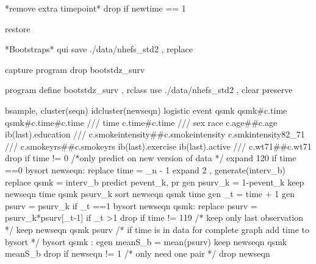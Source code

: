 \documentclass[
  10pt,
  a4paper,
]{book}
\newenvironment{Shaded}{\begin{snugshade}}{\end{snugshade}}
\newcommand{\CommentTok}[1]{\textcolor[rgb]{0.37,0.37,0.37}{#1}}
\newcommand{\DataTypeTok}[1]{\textcolor[rgb]{0.68,0.00,0.00}{#1}}
\newcommand{\FunctionTok}[1]{\textcolor[rgb]{0.28,0.35,0.67}{#1}}
\newcommand{\KeywordTok}[1]{\textcolor[rgb]{0.00,0.46,0.62}{#1}}
\newcommand{\NormalTok}[1]{\textcolor[rgb]{0.00,0.46,0.62}{#1}}
\begin{document}
\begin{Shaded}
\begin{Highlighting}[]
\NormalTok{*remove extra timepoint*}
\KeywordTok{drop} \KeywordTok{if}\NormalTok{ newtime == 1}

\KeywordTok{restore}

\NormalTok{*Bootstraps*}
\KeywordTok{qui} \KeywordTok{save}\NormalTok{ ./}\KeywordTok{data}\NormalTok{/nhefs\_std2 , }\KeywordTok{replace}
 
\KeywordTok{capture} \KeywordTok{program} \KeywordTok{drop}\NormalTok{ bootstdz\_surv}

\KeywordTok{program} \KeywordTok{define}\NormalTok{ bootstdz\_surv , rclass}
\KeywordTok{use}\NormalTok{ ./}\KeywordTok{data}\NormalTok{/nhefs\_std2 , }\KeywordTok{clear}
\KeywordTok{preserve}

\KeywordTok{bsample}\NormalTok{, }\KeywordTok{cluster}\NormalTok{(seqn) idcluster(newseqn)       }
\KeywordTok{logistic}\NormalTok{ event qsmk qsmk\#c.time qsmk\#c.time\#c.time }\CommentTok{///}
\NormalTok{  time c.time\#c.time }\CommentTok{///}
\NormalTok{    sex race c.age\#\#c.age ib(}\FunctionTok{last}\NormalTok{).education }\CommentTok{///}
\NormalTok{    c.smokeintensity\#\#c.smokeintensity c.smkintensity82\_71 }\CommentTok{///}
\NormalTok{    c.smokeyrs\#\#c.smokeyrs ib(}\FunctionTok{last}\NormalTok{).exercise ib(}\FunctionTok{last}\NormalTok{).active }\CommentTok{///}
\NormalTok{    c.wt71\#\#c.wt71 }
\KeywordTok{drop} \KeywordTok{if}\NormalTok{ time != 0   }
\CommentTok{/*only predict on new version of data */}
\NormalTok{expand 120 }\KeywordTok{if}\NormalTok{ time ==0 }
\KeywordTok{bysort}\NormalTok{ newseqn: }\KeywordTok{replace}\NormalTok{ time = }\DataTypeTok{\_n}\NormalTok{ {-} 1               }
\NormalTok{expand 2 , }\KeywordTok{generate}\NormalTok{(interv\_b) }
\KeywordTok{replace}\NormalTok{ qsmk = interv\_b          }
\KeywordTok{predict}\NormalTok{ pevent\_k, pr}
\KeywordTok{gen}\NormalTok{ psurv\_k = 1{-}pevent\_k}
\KeywordTok{keep}\NormalTok{ newseqn  time qsmk psurv\_k                 }
\KeywordTok{sort}\NormalTok{ newseqn qsmk time}
\KeywordTok{gen}\NormalTok{ \_t = time + 1}
\KeywordTok{gen}\NormalTok{ psurv = psurv\_k }\KeywordTok{if}\NormalTok{ \_t ==1   }
\KeywordTok{bysort}\NormalTok{ newseqn  qsmk: }\KeywordTok{replace}\NormalTok{ psurv = psurv\_k*psurv[\_t{-}1] }\KeywordTok{if}\NormalTok{ \_t \textgreater{}1 }
\KeywordTok{drop}  \KeywordTok{if}\NormalTok{ time != 119   }\CommentTok{/* keep only last observation */}
\KeywordTok{keep}\NormalTok{ newseqn qsmk psurv    }
\CommentTok{/* if time is in data for complete graph add time to bysort */}  
\KeywordTok{bysort}\NormalTok{ qsmk  : }\KeywordTok{egen}\NormalTok{ meanS\_b = }\KeywordTok{mean}\NormalTok{(psurv)}
\KeywordTok{keep}\NormalTok{ newseqn qsmk  meanS\_b }
\KeywordTok{drop} \KeywordTok{if}\NormalTok{ newseqn != 1  }\CommentTok{/* only need one pair */}
\KeywordTok{drop}\NormalTok{ newseqn        }
    

\end{Highlighting}
\end{Shaded}
\end{document}
